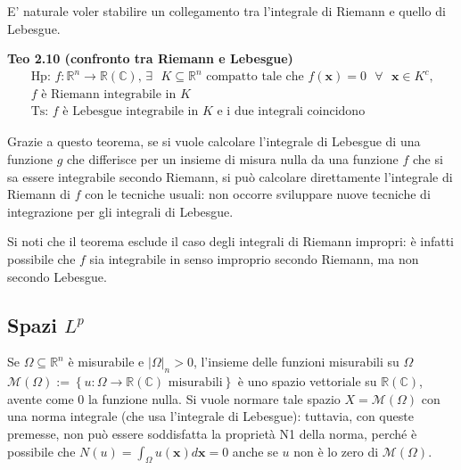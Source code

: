 \documentclass{article}
\begin{document}
E' naturale voler stabilire un collegamento tra l'integrale di Riemann e
quello di Lebesgue.

\textbf{Teo 2.10 (confronto tra Riemann e Lebesgue)} 
\begin{gather*}
\text{Hp: }f:%
\mathbb{R}
^{n}\rightarrow 
\mathbb{R}
\left( 
\mathbb{C}
\right) \text{, }\exists \text{ }K\subseteq 
\mathbb{R}
^{n}\text{ compatto tale che }f\left( \mathbf{x}\right) =0\text{ }\forall 
\text{ }\mathbf{x}\in K^{c}\text{,} \\
f\text{ \`{e} Riemann integrabile in }K \\
\text{Ts: }f\text{ \`{e} Lebesgue integrabile in }K\text{ e i due integrali
coincidono}
\end{gather*}

Grazie a questo teorema, se si vuole calcolare l'integrale di Lebesgue di
una funzione $g$ che differisce per un insieme di misura nulla da una
funzione $f$ che si sa essere integrabile secondo Riemann, si pu\`{o}
calcolare direttamente l'integrale di Riemann di $f$ con le tecniche usuali:
non occorre sviluppare nuove tecniche di integrazione per gli integrali di
Lebesgue.

Si noti che il teorema esclude il caso degli integrali di Riemann impropri: 
\`{e} infatti possibile che $f$ sia integrabile in senso improprio secondo
Riemann, ma non secondo Lebesgue.

\subsection{Spazi $L^{p}$}

Se $\Omega \subseteq 
\mathbb{R}
^{n}$ \`{e} misurabile e $\left\vert \Omega \right\vert _{n}>0$, l'insieme
delle funzioni misurabili su $\Omega $ $\mathcal{M}\left( \Omega \right)
:=\left\{ u:\Omega \rightarrow 
\mathbb{R}
\left( 
\mathbb{C}
\right) \text{ misurabili}\right\} $ \`{e} uno spazio vettoriale su $%
\mathbb{R}
\left( 
\mathbb{C}
\right) $, avente come $0$ la funzione nulla. Si vuole normare tale spazio $%
X=\mathcal{M}\left( \Omega \right) $ con una norma integrale (che usa
l'integrale di Lebesgue): tuttavia, con queste premesse, non pu\`{o} essere
soddisfatta la propriet\`{a} N1 della norma, perch\'{e} \`{e} possibile che $%
N\left( u\right) =\int_{\Omega }u\left( \mathbf{x}\right) d\mathbf{x}=0$
anche se $u$ non \`{e} lo zero di $\mathcal{M}\left( \Omega \right) $.
\end{document}
